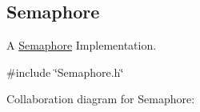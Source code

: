 \hypertarget{a00001}{}\subsection{Semaphore}
\label{a00001}


A \hyperlink{a00001}{Semaphore} Implementation.  




{\ttfamily \#include \char`\"{}Semaphore.\+h\char`\"{}}



Collaboration diagram for Semaphore\+:
